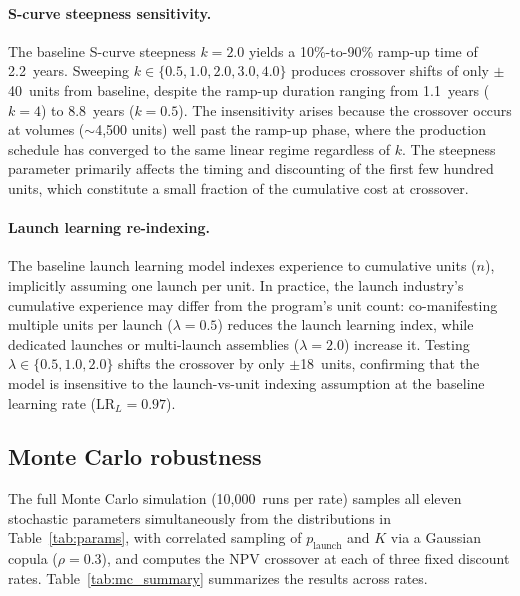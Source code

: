 \documentclass[preprint,12pt]{elsarticle}
\begin{document}
\paragraph{S-curve steepness sensitivity.} The baseline S-curve steepness $k = 2.0$ yields a 10\%-to-90\% ramp-up time of 2.2~years. Sweeping $k \in \{0.5, 1.0, 2.0, 3.0, 4.0\}$ produces crossover shifts of only $\pm$40~units from baseline, despite the ramp-up duration ranging from 1.1~years ($k = 4$) to 8.8~years ($k = 0.5$). The insensitivity arises because the crossover occurs at volumes ($\sim$4{,}500 units) well past the ramp-up phase, where the production schedule has converged to the same linear regime regardless of $k$. The steepness parameter primarily affects the timing and discounting of the first few hundred units, which constitute a small fraction of the cumulative cost at crossover.

\paragraph{Launch learning re-indexing.} The baseline launch learning model indexes experience to cumulative units ($n$), implicitly assuming one launch per unit. In practice, the launch industry's cumulative experience may differ from the program's unit count: co-manifesting multiple units per launch ($\lambda = 0.5$) reduces the launch learning index, while dedicated launches or multi-launch assemblies ($\lambda = 2.0$) increase it. Testing $\lambda \in \{0.5, 1.0, 2.0\}$ shifts the crossover by only $\pm$18~units, confirming that the model is insensitive to the launch-vs-unit indexing assumption at the baseline learning rate ($\mathrm{LR}_L = 0.97$).

\subsection{Monte Carlo robustness}
\label{sec:mc_robustness}

The full Monte Carlo simulation (10{,}000~runs per rate) samples all eleven stochastic parameters simultaneously from the distributions in Table~\ref{tab:params}, with correlated sampling of $p_{\mathrm{launch}}$ and $K$ via a Gaussian copula ($\rho = 0.3$), and computes the NPV crossover at each of three fixed discount rates. Table~\ref{tab:mc_summary} summarizes the results across rates.
\end{document}

